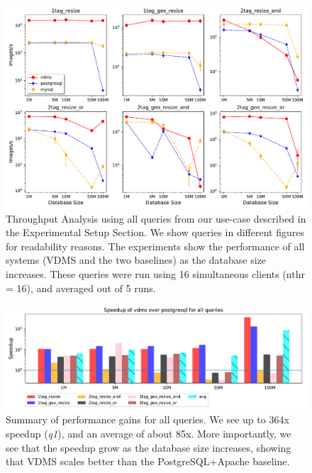 \begin{figure}[ht!]
\includegraphics[width=\columnwidth]{figures/plot_th_16_mosaic_results_throughput}
\caption{Throughput Analysis using all queries from our use-case
described in the Experimental Setup Section.
We show queries in different figures for readability reasons.
The experiments show the performance of all systems (VDMS and the two baselines) as the
database size increases.
These queries were run using 16 simultaneous clients (nthr = 16),
and averaged out of 5 runs.}
\label{fig:q_throughput_16}
\end{figure}




\begin{figure}[ht!]
\centering
\includegraphics[width=\textwidth]{figures/plot_th_56_query_times_speedup_postgresql}
\caption{Summary of performance gains for all queries.
We see up to 364x speedup (\textit{q1}), and an average of about 85x.
More importantly, we see that the speedup grow as the database size increases,
showing that VDMS scales better than the PostgreSQL+Apache baseline.}
\label{fig:summary_postgresql}
\end{figure}

